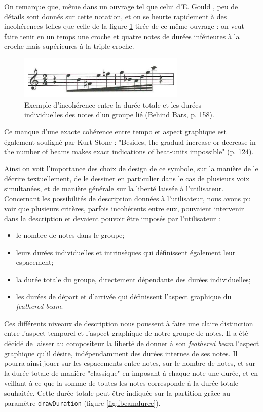 \documentclass{article}
\newcommand{\code}[1]		{{\small \texttt{#1}}}
\begin{document}
On remarque que, même dans un ouvrage tel que celui d'E. Gould \cite{gould2011behind}, peu de détails sont donnés sur cette notation, et on se heurte rapidement à des incohérences telles que celle de la figure \ref{fig:incoherence} tirée de ce même ouvrage : on veut faire tenir en un temps une croche et quatre notes de durées inférieures à la croche mais supérieures à la triple-croche. 

\begin{figure}[h]
\centering
\includegraphics[width=8cm]{img/behindbars.jpg}
\caption{Exemple d'incohérence entre la durée totale et les durées individuelles des notes d'un groupe lié (Behind Bars, p. 158). }
\label{fig:incoherence}
\end{figure}

Ce manque d'une exacte cohérence entre tempo et aspect graphique est également souligné par Kurt Stone \cite{stone1980music} : "Besides, the gradual increase or decrease in the number of beams makes exact indications of beat-units impossible" (p. 124).

Ainsi on voit l'importance des choix de design de ce symbole, sur la manière de le décrire textuellement, de le dessiner en particulier dans le cas de plusieurs voix simultanées, et de manière générale sur la liberté laissée à l'utilisateur.
\\

Concernant les possibilités de description données à l'utilisateur, nous avons pu voir que plusieurs critères, parfois incohérents entre eux, pouvaient intervenir dans la description et devaient pouvoir être imposés par l'utilisateur :
\begin{itemize}
\item le nombre de notes dans le groupe;
\item leurs durées individuelles et intrinsèques qui définissent également leur espacement;
\item la durée totale du groupe, directement dépendante des durées individuelles;
\item les durées de départ et d'arrivée qui définissent l'aspect graphique du \emph{feathered beam}.
\end{itemize}
\bigskip

Ces différents niveaux de description nous poussent à faire une claire distinction entre l'aspect temporel et l'aspect graphique de notre groupe de notes.  Il a été décidé de laisser au compositeur la liberté de donner à son \emph{feathered beam} l'aspect graphique qu'il désire, indépendamment des durées internes de ses notes. Il pourra ainsi jouer sur les espacements entre notes, sur le nombre de notes, et sur la durée totale de manière "classique" en imposant à chaque note une durée, et en veillant à ce que la somme de toutes les notes corresponde à la durée totale souhaitée. Cette durée totale peut être indiquée sur la partition grâce au paramètre \code{drawDuration} (figure \ref{fig:fbeamduree}).
\end{document}
